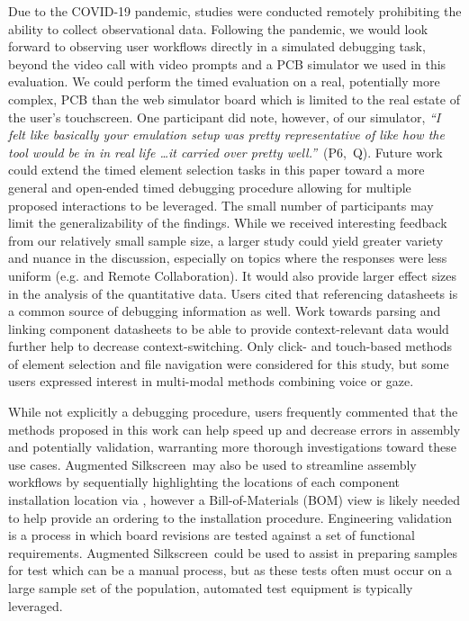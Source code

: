 \documentclass [11pt, proquest] {uwthesis}[2020/02/24]
\newcommand{\ASname}{Augmented Silkscreen}
\newcounter{sharc}
\newcommand{\sharcHere}[1]{Q\refstepcounter{sharc}\arabic{sharc}\label{#1}}
\begin{document}
Due to the COVID-19 pandemic, studies were conducted remotely prohibiting the ability to collect observational data. Following the pandemic, we would look forward to observing user workflows directly in a simulated debugging task, beyond the video call with video prompts and a PCB simulator we used in this evaluation.
We could perform the timed evaluation on a real, potentially more complex, PCB than the web simulator board which is limited to the real estate of the user's touchscreen.
One participant did note, however, of our simulator,
\textit{``I felt like basically your emulation setup was pretty representative of like how the tool would be in in real life \ldots it carried over pretty well.''}~(P6,~\sharcHere{q:emulation}).
Future work could extend the timed element selection tasks in this paper toward a more general and open-ended timed debugging procedure allowing for multiple proposed interactions to be leveraged.
The small number of participants may limit the generalizability of the findings. While we received interesting feedback from our relatively small sample size, a larger study could yield greater variety and nuance in the discussion, especially on topics where the responses were less uniform (e.g. \MetaDataOnPCB and Remote Collaboration). It would also provide larger effect sizes in the analysis of the quantitative data.
Users cited that referencing datasheets is a common source of debugging information as well.
Work towards parsing and linking component datasheets to be able to provide context-relevant data would further help to decrease context-switching.
Only click- and touch-based methods of element selection and file navigation were considered for this study, but some users expressed interest in multi-modal methods combining voice or gaze.

While not explicitly a debugging procedure, users frequently commented that the methods proposed in this work can help speed up and decrease errors in assembly and potentially validation, warranting more thorough investigations toward these use cases. \ASname\ may also be used to streamline assembly workflows by sequentially highlighting the locations of each component installation location via \ElemLocOnPCB, however a Bill-of-Materials (BOM) view is likely needed to help provide an ordering to the installation procedure. Engineering validation is a process in which board revisions are tested against a set of functional requirements. \ASname\ could be used to assist in preparing samples for test which can be a manual process, but as these tests often must occur on a large sample set of the population, automated test equipment is typically leveraged.
\end{document}
